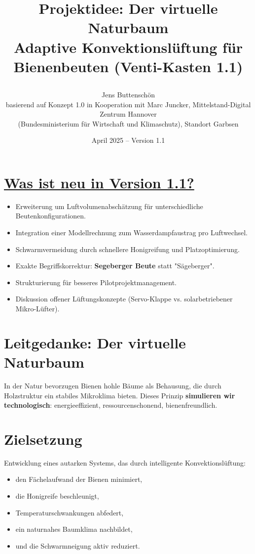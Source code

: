 \documentclass[11pt,a4paper]{article}
\title{\parbox{\linewidth}{\centering\textbf{
Projektidee: Der virtuelle Naturbaum\\
Adaptive Konvektionsl\"uftung f\"ur Bienenbeuten (Venti-Kasten 1.1)}}}
\author{\parbox{\linewidth}{\centering
Jens Buttensch\"on\\
\small basierend auf Konzept 1.0 in Kooperation mit Marc Juncker, Mittelstand-Digital Zentrum Hannover\\
(Bundesministerium f\"ur Wirtschaft und Klimaschutz), Standort Garbsen}}
\date{April 2025 -- Version 1.1}
\begin{document}
\maketitle

\section*{\normalsize \underline{Was ist neu in Version 1.1?}}
\begin{itemize}[topsep=2pt]
  \item Erweiterung um Luftvolumenabsch\"atzung f\"ur unterschiedliche Beutenkonfigurationen.
  \item Integration einer Modellrechnung zum Wasserdampfaustrag pro Luftwechsel.
  \item Schwarmvermeidung durch schnellere Honigreifung und Platzoptimierung.
  \item Exakte Begriffskorrektur: \textbf{Segeberger Beute} statt "S\"ageberger".
  \item Strukturierung f\"ur besseres Pilotprojektmanagement.
  \item Diskussion offener L\"uftungskonzepte (Servo-Klappe vs. solarbetriebener Mikro-L\"ufter).
\end{itemize}

\section*{Leitgedanke: Der virtuelle Naturbaum}
In der Natur bevorzugen Bienen hohle B\"aume als Behausung, die durch Holzstruktur ein stabiles Mikroklima bieten. Dieses Prinzip \textbf{simulieren wir technologisch}: energieeffizient, ressourcenschonend, bienenfreundlich.

\section{Zielsetzung}
Entwicklung eines autarken Systems, das durch intelligente Konvektionsl\"uftung:
\begin{itemize}[topsep=2pt]
  \item den F\"achelaufwand der Bienen minimiert,
  \item die Honigreife beschleunigt,
  \item Temperaturschwankungen abfedert,
  \item ein naturnahes Baumklima nachbildet,
  \item und die Schwarmneigung aktiv reduziert.
\end{itemize}
\end{document}
